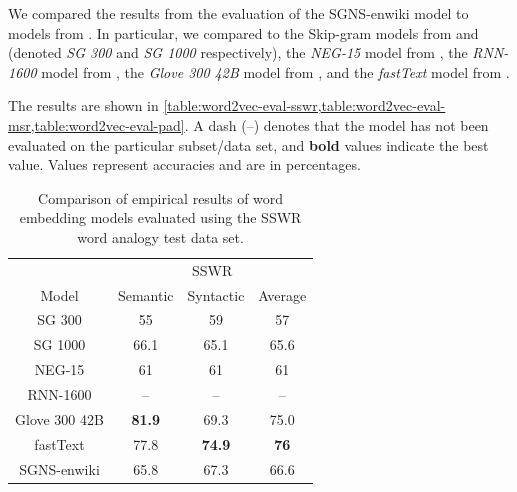 We compared the results from the evaluation of the SGNS-enwiki model to models from \cite{mikolov2013a, mikolov2013b, mikolov-etal-2013-linguistic, bojanowski2017enriching}. In particular, we compared to the Skip-gram models from \cite[Table 3]{mikolov2013a} and \cite[Table 6]{mikolov2013a} (denoted \textit{SG 300} and \textit{SG 1000} respectively), the \textit{NEG-15} model from \cite[Table 1 and 3]{mikolov2013b}, the \textit{RNN-1600} model from \cite[Table 2]{mikolov-etal-2013-linguistic}, the \textit{Glove 300 42B} model from \cite[Table 2]{pennington2014glove}, and the \textit{fastText} model from \cite[Table 2]{bojanowski2017enriching}.

The results are shown in \cref{table:word2vec-eval-sswr,table:word2vec-eval-msr,table:word2vec-eval-pad}. A dash (--) denotes that the model has not been evaluated on the particular subset/data set, and \textbf{bold} values indicate the best value. Values represent accuracies and are in percentages.
\begin{table}[H]
    \centering
    \begin{tabular}{@{}cccc@{}}
    \toprule
    & \multicolumn{3}{c}{SSWR} \\ \cmidrule(l){2-4}
    \multirow{-2}{*}{Model} & Semantic & Syntactic & Average \\ \midrule
    \trcolor
    SG 300 & 55 & 59 & 57 \\
    SG 1000 & 66.1 & 65.1 & 65.6 \\
    \trcolor
    NEG-15 & 61 & 61 & 61 \\
    RNN-1600 & -- & -- & -- \\
    \trcolor
    Glove 300 42B & \textbf{81.9} & 69.3 & 75.0 \\
    fastText & 77.8 & \textbf{74.9} & \textbf{76} \\
    \trcolor
    SGNS-enwiki & 65.8 & 67.3 & 66.6 \\
    \bottomrule
    \end{tabular}
    \caption{Comparison of empirical results of word embedding models evaluated using the SSWR word analogy test data set.}
    \label{table:word2vec-eval-sswr}
\end{table}
